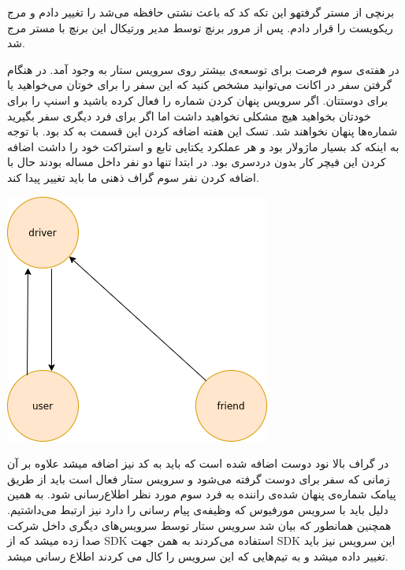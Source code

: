 \documentclass[a4]{report}
\begin{document}
برنچی از مستر گرفتهو این تکه کد که باعث نشتی حافظه می‌شد را تغییر دادم و مرج ریکويست را قرار دادم. پس از مرور برنچ توسط مدیر ورتیکال این برنچ با مستر مرج شد.


در هفته‌ی سوم فرصت برای توسعه‌ی بیشتر روی سرویس ستار به وجود آمد.
در هنگام گرفتن سفر در اکانت می‌توانید مشخص کنید که این سفر را برای خوتان می‌خواهید یا برای دوستتان.
اگر سرویس پنهان کردن شماره را فعال کرده باشید و اسنپ را برای خودتان بخواهید هیچ مشکلی نخواهید داشت اما اگر برای فرد دیگری سفر بگیرید شماره‌ها پنهان نخواهند شد.
تسک این هفته اضافه کردن این قسمت به کد بود.
با توجه به اینکه کد بسیار ماژولار بود و هر عملکرد یکتایی تابع و استراکت خود را داشت اضافه کردن این فیچر کار بدون دردسری بود.
در ابتدا تنها دو نفر داخل مساله بودند حال با اضافه کردن نفر سوم گراف ذهنی ما باید
تغییر پیدا کند.

\includegraphics[scale=0.5]{fig/call-graph}

در گراف بالا نود دوست اضافه شده است که باید به کد نیز اضافه میشد علاوه بر آن زمانی که سفر برای دوست گرفته می‌شود و سرویس ستار فعال است
باید از طریق پیامک شماره‌ی پنهان شده‌ی راننده به فرد سوم مورد نظر اطلاع‌رسانی شود.
به همین دلیل باید با سرویس مورفیوس که وظیفه‌ی پیام رسانی را دارد نیز ارتبط می‌داشتیم.
همچنین همانطور که بیان شد سرویس ستار توسط سرویس‌های دیگری داخل شرکت صدا زده میشد که از SDK استفاده می‌کردند
به همن جهت SDK این سرویس نیز باید تغییر داده میشد و به تیم‌هایی که این سرویس را کال می کردند اطلاع رسانی میشد.
\end{document}
